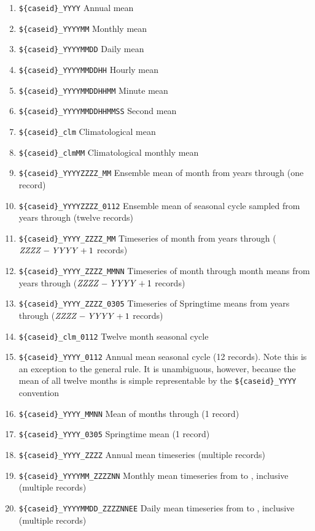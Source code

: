\documentclass[12pt,twoside]{article}
\begin{document}
\begin{enumerate}
\item \verb'${caseid}_YYYY' Annual mean
\item \verb'${caseid}_YYYYMM' Monthly mean
\item \verb'${caseid}_YYYYMMDD' Daily mean
\item \verb'${caseid}_YYYYMMDDHH' Hourly mean
\item \verb'${caseid}_YYYYMMDDHHMM' Minute mean
\item \verb'${caseid}_YYYYMMDDHHMMSS' Second mean

\item \verb'${caseid}_clm' Climatological mean
\item \verb'${caseid}_clmMM' Climatological monthly mean

\item \verb'${caseid}_YYYYZZZZ_MM' Ensemble mean of month 
from years  through  (one record)
\item \verb'${caseid}_YYYYZZZZ_0112' Ensemble mean of seasonal cycle sampled
from years  through  (twelve records)
\item \verb'${caseid}_YYYY_ZZZZ_MM' Timeseries of month  from years 
through  ($\mbox{\varprn{ZZZZ}} - \mbox{\varprn{YYYY}} + 1$ records)
\item \verb'${caseid}_YYYY_ZZZZ_MMNN' Timeseries of month 
  through month  means from years  through  
($\mbox{\varprn{ZZZZ}} - \mbox{\varprn{YYYY}} + 1$ records)
\item \verb'${caseid}_YYYY_ZZZZ_0305' Timeseries of Springtime means from
years  through  
($\mbox{\varprn{ZZZZ}} - \mbox{\varprn{YYYY}} + 1$ records) 

\item \verb'${caseid}_clm_0112' Twelve month seasonal cycle
\item \verb'${caseid}_YYYY_0112' Annual mean seasonal cycle (12
records). 
Note this is an exception to the general rule. 
It is unambiguous, however, because the mean of all twelve months
is simple representable by the \verb'${caseid}_YYYY' convention
\item \verb'${caseid}_YYYY_MMNN' Mean of months  through  (1 record)
\item \verb'${caseid}_YYYY_0305' Springtime mean (1 record)
\item \verb'${caseid}_YYYY_ZZZZ' Annual mean timeseries (multiple records)
\item \verb'${caseid}_YYYYMM_ZZZZNN' Monthly mean timeseries from  to
, inclusive (multiple records)
\item \verb'${caseid}_YYYYMMDD_ZZZZNNEE' Daily mean timeseries from 
to , inclusive (multiple records)


\end{enumerate}
\end{document}
